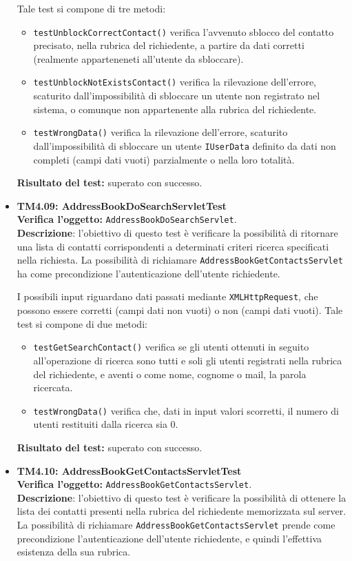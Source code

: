 \begin{itemize}
Tale test si compone di tre metodi:
\begin{itemize}
\item \texttt{testUnblockCorrectContact()} verifica l'avvenuto sblocco del contatto precisato, nella rubrica del richiedente, a partire da dati corretti (realmente apparteneneti all'utente da sbloccare).
\item \texttt{testUnblockNotExistsContact()} verifica la rilevazione dell'errore, scaturito dall'impossibilità di sbloccare un utente non registrato nel sistema, o comunque non appartenente alla rubrica del richiedente.
\item \texttt{testWrongData()} verifica la rilevazione dell'errore, scaturito dall'impossibilità di sbloccare un utente \texttt{IUserData} definito da dati non completi (campi dati vuoti) parzialmente o nella loro totalità.
\end{itemize}
\textbf{Risultato del test:} superato con successo.

\item \textbf{TM4.09: AddressBookDoSearchServletTest}\\
\textbf{Verifica l'oggetto:} \texttt{AddressBookDoSearchServlet}.\\
\textbf{Descrizione}: l'obiettivo di questo test è verificare la possibilità di ritornare una lista di contatti corrispondenti a determinati criteri ricerca specificati nella richiesta. La possibilità di richiamare \texttt{AddressBookGetContactsServlet} ha come precondizione l'autenticazione dell'utente richiedente.

I possibili input riguardano dati passati mediante \texttt{XMLHttpRequest}, che possono essere corretti (campi dati non vuoti) o non (campi dati vuoti).
Tale test si compone di due metodi:
\begin{itemize}
\item \texttt{testGetSearchContact()} verifica se gli utenti ottenuti in seguito all'operazione di ricerca sono tutti e soli gli utenti registrati nella rubrica del richiedente, e aventi o come nome, cognome o mail, la parola ricercata.
\item \texttt{testWrongData()} verifica che, dati in input valori scorretti, il numero di utenti restituiti dalla ricerca sia 0.
\end{itemize}
\textbf{Risultato del test:} superato con successo.

\item \textbf{TM4.10: AddressBookGetContactsServletTest}\\
\textbf{Verifica l'oggetto:} \texttt{AddressBookGetContactsServlet}.\\
\textbf{Descrizione}: l'obiettivo di questo test è verificare la possibilità di ottenere la lista dei contatti presenti nella rubrica del richiedente memorizzata sul server. La possibilità di richiamare \texttt{AddressBookGetContactsServlet} prende come precondizione l'autenticazione dell'utente richiedente, e quindi l'effettiva esistenza della sua rubrica.


\end{itemize}
